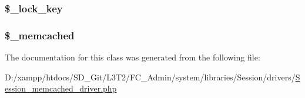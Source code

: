 \subsubsection[{\$\+\_\+lock\+\_\+key}]{\setlength{\rightskip}{0pt plus 5cm}\$\+\_\+lock\+\_\+key\hspace{0.3cm}{\ttfamily [protected]}}\label{class_c_i___session__memcached__driver_a79bf61cb0768c7bb23404280ae004fb4}
\hypertarget{class_c_i___session__memcached__driver_a9ce5188201bbc41ed4374947a35dadcc}{}
\subsubsection[{\$\+\_\+memcached}]{\setlength{\rightskip}{0pt plus 5cm}\$\+\_\+memcached\hspace{0.3cm}{\ttfamily [protected]}}\label{class_c_i___session__memcached__driver_a9ce5188201bbc41ed4374947a35dadcc}


The documentation for this class was generated from the following file\+:\begin{DoxyCompactItemize}
\item 
D\+:/xampp/htdocs/\+S\+D\+\_\+\+Git/\+L3\+T2/\+F\+C\+\_\+\+Admin/system/libraries/\+Session/drivers/\hyperlink{_session__memcached__driver_8php}{Session\+\_\+memcached\+\_\+driver.\+php}\end{DoxyCompactItemize}
